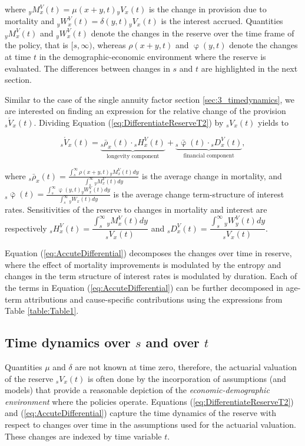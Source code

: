 \documentclass[12pt]{article}
\begin{document}
where ${}_yM^V_x(t)=\mu(x+y,t){}_yV_x(t)$ is the change in provision due to mortality and ${}_yW^V_x(t)=\delta(y,t){}_yV_x(t)$ is the interest accrued. Quantities ${}_yM^V_x(t)$ and ${}_yW^V_x(t)$ denote the changes in the reserve over the time frame of the policy, that is $[s,\infty)$, whereas $\rho(x+y,t)$ and $\upvarphi(y,t)$ denote the changes at time $t$ in the demographic-economic environment where the reserve is evaluated. The differences between changes in $s$ and $t$ are highlighted in the next section.

Similar to the case of the single annuity factor section \ref{sec:3_timedynamics}, we are interested on finding an expression for the relative change of the provision ${}_s\acute{V}_x(t)$. Dividing Equation (\ref{eq:DifferentiateReserveT2}) by ${}_sV_x(t)$ yields to

\begin{equation}\label{eq:AccuteDifferential}
	{}_s\acute{V}_x(t)= \underbrace{{}_s\bar{\rho}_x(t) \cdot {}_sH_x^V(t)}_\text{longevity component} + \underbrace{{}_s\bar{\upvarphi}(t)\cdot {}_sD_x^V(t)}_\text{financial component},
\end{equation}


where ${}_s\bar{\rho}_x(t)= \frac{\int_s^\infty \rho(x+y,t) {}_yM^V_x(t)  dy}{\int_s^\infty {}_yM^V_x(t)dy}$ is the average change in mortality, and 
${}_s\bar{\upvarphi}(t)= \frac{\int_s^\infty \upvarphi(y,t) {}_yW^V_x(t)  dy}{\int_s^\infty {}_yW_x(t) dy}$ is the average change term-structure of interest rates. Sensitivities of the reserve to changes in mortality and interest are respectively ${}_sH_x^V(t)= \dfrac{\int_{s}^{\infty}{}_yM^V_x(t)dy}{{}_sV_x(t)}$ and ${}_sD_x^V(t)= \dfrac{\int_{s}^{\infty}{}_yW^V_y(t)dy}{{}_sV_x(t)}$.


Equation (\ref{eq:AccuteDifferential}) decomposes the changes over time in reserve, where the effect of mortality improvements is modulated by the entropy and changes in the term structure of interest rates is modulated by duration. Each of the terms in Equation (\ref{eq:AccuteDifferential}) can be further decomposed in age-term attributions and cause-specific contributions using the expressions from Table \ref{table:Table1}. 


\subsection{Time dynamics over $s$ and over $t$}\label{sec:ThieleEquations}


Quantities $\mu$ and $\delta$ are not known at time zero, therefore, the actuarial valuation of the reserve ${}_sV_x(t)$ is often done by the incorporation of assumptions (and models) that provide a reasonable depiction of the \textit{economic-demographic environment} where the policies operate. Equations (\ref{eq:DifferentiateReserveT2}) and (\ref{eq:AccuteDifferential}) capture the time dynamics of the reserve with respect to changes over time in the assumptions used for the actuarial valuation. These changes are indexed by time variable $t$.
\end{document}
